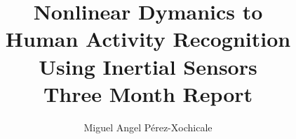 \documentclass[letterpaper,times,numbered,print,custommargin]{Classes/PhDThesisPSnPDF}
\title{
Nonlinear Dymanics to\\
 Human Activity Recognition \\
Using Inertial Sensors
\\
\vspace{5mm}
\Large{Three Month Report }\\
}
\author{Miguel Angel P\'erez-Xochicale}
\begin{document}
\frontmatter


\begin{titlepage}
\maketitle
\end{titlepage}

% 

% 


\mainmatter




\begin{spacing}{0.9}

% 

\cleardoublepage


\end{spacing}


\begin{appendices} %
% 
\end{appendices}

\printthesisindex %
\end{document}
